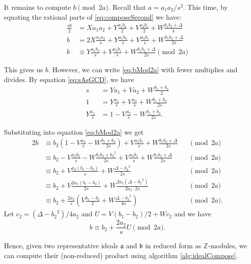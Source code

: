 \documentclass{ucalgthes1}
\theoremstyle{plain}
\theoremstyle{definition}
\newcommand{\ZZ}{\mathbb{Z}}
\begin{document}
It remains to compute $b \pmod{2a}$.  Recall that $a = a_1a_2/s^2$.  This time, by equating the rational parts of \eqref{eq:composeSecond} we have:
\begin{align}
	\frac{sb}{2} & = Xa_1a_2 + Y\frac{a_1b_2}{2} + V\frac{a_2b_1}{2} + W\frac{b_1b_2 + \Delta}{4} \nonumber \\
	b & = 2X\frac{a_1a_2}{s} + Y\frac{a_1b_2}{s} + V\frac{a_2b_1}{s} + W\frac{b_1b_2 + \Delta}{2s} \nonumber \\
	b & \equiv Y\frac{a_1b_2}{s} + V\frac{a_2b_1}{s} + W\frac{b_1b_2 + \Delta}{2s} \pmod{2a} \label{eq:bMod2a}
\end{align}

\noindent
This gives us $b$.  However, we can write \eqref{eq:bMod2a} with fewer multiplies and divides.  By equation \eqref{eq:sAsGCD}, we have
\begin{align*}
	s & = Ya_1 + Va_2 + W\frac{b_1+b_2}{2} \\
	1 & = Y\frac{a_1}{s} + V\frac{a_2}{s} + W\frac{b_1+b_2}{2s} \\
	Y\frac{a_1}{s} & = 1 - V\frac{a_2}{s} - W\frac{b_1+b_2}{2s}.
\end{align*}

\noindent
Substituting into equation \eqref{eq:bMod2a} we get
\begin{alignat*}{2}
	b & \equiv b_2(1-V\frac{a_2}{s} - W\frac{b_1+b_2}{2s}) + V\frac{a_2b_1}{s} + W\frac{b_1b_2 + \Delta}{2s} && \pmod{2a} \\
	& \equiv b_2 - V\frac{a_2b_2}{s} - W\frac{b_1b_2+{b_2}^2}{2s} + V\frac{a_2b_1}{s} + W\frac{b_1b_2 + \Delta}{2s} && \pmod{2a} \\
	& \equiv b_2 + V\frac{a_2(b_1-b_2)}{s} + W\frac{\Delta - {b_2}^2}{2s} && \pmod{2a} \\
	& \equiv b_2 + V\frac{2a_2(b_1-b_2)}{2s} + W\frac{2a_2(\Delta - {b_2}^2)}{2a_2 \cdot 2s} && \pmod{2a} \\
	& \equiv b_2 + \frac{2a_2}{s} \left( V\frac{b_1-b_2}{2} + W\frac{\Delta - {b_2}^2}{4a} \right) && \pmod{2a}.
\end{alignat*}
Let $c_2 = (\Delta - {b_2}^2)/4a_2$ and $U = V(b_1-b_2)/2 + Wc_2$ and we have
\[
	b \equiv b_2 + \frac{2a_2}{s} U \pmod{2a}.
\]

\noindent
Hence, given two representative ideals $\mathfrak a$ and $\mathfrak b$ in reduced form as $\ZZ$-modules, we can compute their (non-reduced) product using algorithm \ref{alg:idealCompose}.
\end{document}
